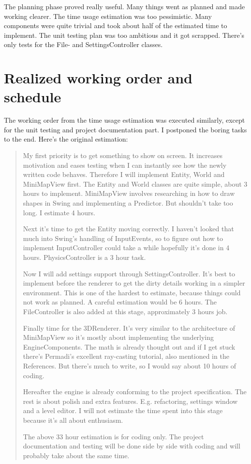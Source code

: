 \documentclass[a4paper,10pt]{article}
\begin{document}
The planning phase proved really useful. Many things went as planned and made
working clearer. The time usage estimation was too pessimistic. Many components
were quite trivial and took about half of the estimated time to implement. The
unit testing plan was too ambitious and it got scrapped. There's only tests for
the File- and SettingsController classes.

\section{Realized working order and schedule}

The working order from the time usage estimation was executed similarly, except
for the unit testing and project documentation part. I postponed the boring
tasks to the end. Here's the original estimation:

\begin{quote}
\textit{}
 
My first priority is to get something to show on screen. It increases motivation
and eases testing when I can instantly see how the newly written code behaves.
Therefore I will implement Entity, World and MiniMapView first. The Entity and
World classes are quite simple, about 3 hours to implement. MiniMapView involves
researching in how to draw shapes in Swing and implementing a Predictor. But
shouldn't take too long. I estimate 4 hours. 

Next it's time to get the Entity moving correctly. I haven't looked that much
into Swing's handling of InputEvents, so to figure out how to implement
InputController could take a while hopefully it's done in 4 hours.
PhysicsController is a 3 hour task.

Now I will add settings support through SettingsController. It's best to
implement before the renderer to get the dirty details working in a simpler
environment. This is one of the hardest to estimate, because things could not
work as planned. A careful estimation would be 6 hours. The FileController is
also added at this stage, approximately 3 hours job.

Finally time for the 3DRenderer. It's very similar to the architecture of
MiniMapView so it's mostly about implementing the underlying EngineComponents.
The math is already thought out and if I get stuck there's Permadi's excellent
ray-casting tutorial, also mentioned in the References. But there's much to
write, so I would say about 10 hours of coding.

Hereafter the engine is already conforming to the project specification. The
rest is about polish and extra features. E.g. refactoring, settings window and a
level editor. I will not estimate the time spent into this stage because it's
all about enthusiasm.

The above 33 hour estimation is for coding only. The project documentation and
testing will be done side by side with coding and will probably take about the
same time.

\end{quote} 
\end{document}
